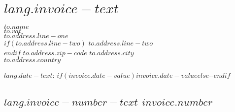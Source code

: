\documentclass[$fontsize$, a4paper, svgnames]{report}
\def\mydate{\leavevmode\hbox{\the\year-\the\month-\the\day}}
\begin{document}
\chapter{$lang.invoice-text$}

\normalsize \sffamily
\textsc{\textbf{$to.name$}}\\
$to.vat$\\[4pt]
$to.address.line-one$\\
$if(to.address.line-two)$
  $to.address.line-two$\\
$endif$
$to.address.zip-code$ $to.address.city$\\
$to.address.country$\\

\vspace{6em}

\begin{flushright}
  \small
  $lang.date-text$: $if(invoice.date-value)$$invoice.date-value$$else$\mydate$endif$
\end{flushright}

\vspace{1em}


\section*{\textbf{$lang.invoice-number-text$ $invoice.number$}}
\footnotesize
{}
\setcounter{pos}{0}
\end{document}
